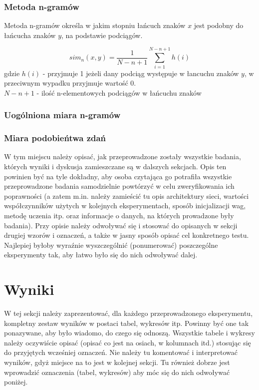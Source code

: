 \documentclass{classrep}
\begin{document}
\subsubsection{Metoda n-gramów}
Metoda n-gramów określa w jakim stopniu łańcuch znaków $x$ jest podobny do łańcucha znaków $y$, na podstawie podciągów.

\begin{equation}
    sim_{n}(x,y)=\frac{1}{N-n+1}\sum_{i=1}^{N-n+1}h(i)
\end{equation}
gdzie $h(i)$ - przyjmuje 1 jeżeli dany podciąg występuje w łancuchu znaków $y$, w przeciwnym wypadku przyjmuje wartość 0.\\
$N-n+1$ - ilość n-elementowych podciągów w łańcuchu znaków

\subsubsection{Uogólniona miara n-gramów}

\subsubsection{Miara podobieńtwa zdań}

{\color{blue}
W tym miejscu należy opisać, jak przeprowadzone zostały wszystkie badania,
których wyniki i dyskusja zamieszczane są w dalszych sekcjach. Opis ten
powinien być na tyle dokładny, aby osoba czytająca go potrafiła wszystkie
przeprowadzone badania samodzielnie powtórzyć w celu zweryfikowania ich
poprawności (a zatem m.in. należy zamieścić tu opis architektury sieci,
wartości współczynników użytych w kolejnych eksperymentach, sposób
inicjalizacji wag, metodę uczenia itp. oraz informacje o danych, na których
prowadzone były badania). Przy opisie należy odwoływać się i stosować do
opisanych w sekcji drugiej wzorów i oznaczeń, a także w jasny sposób opisać
cel konkretnego testu. Najlepiej byłoby wyraźnie wyszczególnić (ponumerować)
poszczególne eksperymenty tak, aby łatwo było się do nich odwoływać dalej.}

\section{Wyniki}
{\color{blue}
W tej sekcji należy zaprezentować, dla każdego przeprowadzonego eksperymentu,
kompletny zestaw wyników w postaci tabel, wykresów itp. Powinny być one tak
ponazywane, aby było wiadomo, do czego się odnoszą. Wszystkie tabele i wykresy
należy oczywiście opisać (opisać co jest na osiach, w kolumnach itd.) stosując
się do przyjętych wcześniej oznaczeń. Nie należy tu komentować i interpretować
wyników, gdyż miejsce na to jest w kolejnej sekcji. Tu również dobrze jest
wprowadzić oznaczenia (tabel, wykresów) aby móc się do nich odwoływać
poniżej.}
\end{document}
